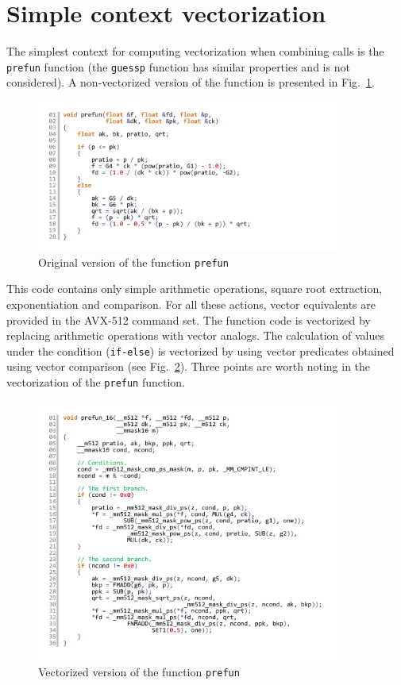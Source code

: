 \documentclass[utf8,english]{psta}%
\begin{document}
\section{Simple context vectorization}

The simplest context for computing vectorization when combining calls is the \texttt{prefun} function (the \texttt{guessp} function has similar properties and is not considered).
A non-vectorized version of the function is presented in Fig.~\ref{pic:prefun_code}.

\begin{figure}
\includegraphics[width=10cm]{pics/pic_prefun_code}
\caption{Original version of the function \texttt{prefun}}
\label{pic:prefun_code}
\end{figure}

This code contains only simple arithmetic operations, square root extraction, exponentiation and comparison.
For all these actions, vector equivalents are provided in the AVX-512 command set.
The function code is vectorized by replacing arithmetic operations with vector analogs.
The calculation of values under the condition (\texttt{if-else}) is vectorized by using vector predicates obtained using vector comparison (see Fig.~\ref{pic:prefun_16_code}).
Three points are worth noting in the vectorization of the \texttt{prefun} function.

\begin{figure}
\includegraphics[width=10cm]{pics/pic_prefun_16_code}
\caption{Vectorized version of the function \texttt{prefun}}
\label{pic:prefun_16_code}
\end{figure}
\end{document}
